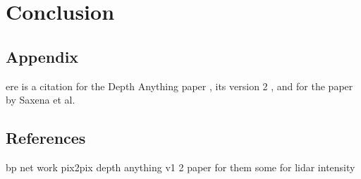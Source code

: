 \chapter{Conclusion}
\section{Appendix}
ere is a citation for the Depth Anything paper \cite{depthanything}, its version 2 \cite{depth_anything_v2}, and for the paper by Saxena et al. \cite{saxena2008depth}

\section{References}
bp net work
pix2pix
depth anything v1 2
paper for them 
some for lidar intensity

